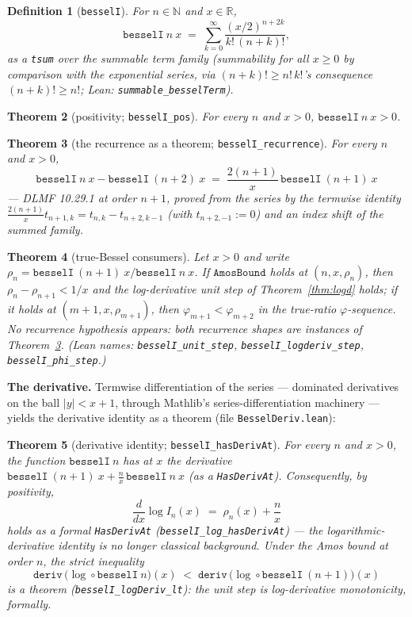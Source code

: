\documentclass[11pt]{article}
\newtheorem{theorem}{Theorem}[section]
\newtheorem{definition}[theorem]{Definition}
\newcommand{\lean}[1]{\texttt{#1}}
\begin{document}
\begin{definition}[\lean{besselI}]\label{def:besselI}
For $n \in \mathbb{N}$ and $x \in \mathbb{R}$,
\[
\lean{besselI}\ n\ x \;=\; \sum_{k=0}^{\infty}
\frac{(x/2)^{n+2k}}{k!\,(n+k)!},
\]
as a \lean{tsum} over the summable term family (summability for all
$x \ge 0$ by comparison with the exponential series, via
$(n+k)! \ge n!\,k!$'s consequence $(n+k)! \ge n!$; Lean:
\lean{summable\_besselTerm}).
\end{definition}

\begin{theorem}[positivity; \lean{besselI\_pos}]\label{thm:besselpos}
For every $n$ and $x > 0$, $\lean{besselI}\ n\ x > 0$.
\end{theorem}

\begin{theorem}[the recurrence as a theorem;
\lean{besselI\_recurrence}]\label{thm:besselrec}
For every $n$ and $x > 0$,
\[
\lean{besselI}\ n\ x - \lean{besselI}\ (n+2)\ x
\;=\; \frac{2(n+1)}{x}\, \lean{besselI}\ (n+1)\ x
\]
--- DLMF 10.29.1 at order $n+1$, proved from the series by the
termwise identity
$\tfrac{2(n+1)}{x} t_{n+1,k} = t_{n,k} - t_{n+2,k-1}$ (with
$t_{n+2,-1} := 0$) and an index shift of the summed family.
\end{theorem}

\begin{theorem}[true-Bessel consumers]
\label{thm:besselconsumers}
Let $x > 0$ and write
$\rho_n = \lean{besselI}\ (n+1)\ x / \lean{besselI}\ n\ x$.
If $\lean{AmosBound}$ holds at $(n, x, \rho_n)$, then
$\rho_n - \rho_{n+1} < 1/x$ and the log-derivative unit step of
Theorem~\ref{thm:logd} holds; if it holds at
$(m+1, x, \rho_{m+1})$, then $\varphi_{m+1} < \varphi_{m+2}$ in the
true-ratio $\varphi$-sequence.  No recurrence hypothesis appears:
both recurrence shapes are instances of
Theorem~\ref{thm:besselrec}.  (Lean names:
\lean{besselI\_unit\_step}, \lean{besselI\_logderiv\_step},
\lean{besselI\_phi\_step}.)
\end{theorem}

\medskip
\noindent\textbf{The derivative.}  Termwise differentiation of the
series --- dominated derivatives on the ball $|y| < x + 1$, through
Mathlib's series-differentiation machinery --- yields the derivative
identity as a theorem (file \lean{BesselDeriv.lean}):

\begin{theorem}[derivative identity;
\lean{besselI\_hasDerivAt}]\label{thm:besselderiv}
For every $n$ and $x > 0$, the function $\lean{besselI}\ n$ has at
$x$ the derivative
$\lean{besselI}\ (n{+}1)\ x + \tfrac{n}{x}\,\lean{besselI}\ n\ x$
(as a \lean{HasDerivAt}).  Consequently, by positivity,
\[
\frac{d}{dx} \log I_n(x) \;=\; \rho_n(x) + \frac{n}{x}
\]
holds as a formal \lean{HasDerivAt}
(\lean{besselI\_log\_hasDerivAt}) --- the logarithmic-derivative
identity is no longer classical background.  Under the Amos bound at
order $n$, the strict inequality
\[
\lean{deriv}\,\bigl(\log \circ \lean{besselI}\ n\bigr)(x)
\;<\;
\lean{deriv}\,\bigl(\log \circ \lean{besselI}\ (n{+}1)\bigr)(x)
\]
is a theorem (\lean{besselI\_logDeriv\_lt}): the unit step \emph{is}
log-derivative monotonicity, formally.
\end{theorem}
\end{document}
